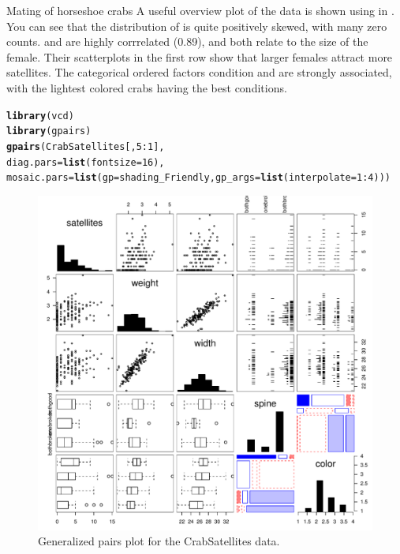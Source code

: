 \documentclass[11pt]{book}\usepackage[]{graphicx}\usepackage[]{color}
\makeatletter
\newcommand{\hlnum}[1]{\textcolor[rgb]{0.686,0.059,0.569}{#1}}%
\newcommand{\hlopt}[1]{\textcolor[rgb]{0,0,0}{#1}}%
\newcommand{\hlstd}[1]{\textcolor[rgb]{0.345,0.345,0.345}{#1}}%
\newcommand{\hlkwc}[1]{\textcolor[rgb]{0.333,0.667,0.333}{#1}}%
\newcommand{\hlkwd}[1]{\textcolor[rgb]{0.737,0.353,0.396}{\textbf{#1}}}%
\newenvironment{kframe}{%
 \def\at@end@of@kframe{}%
 \ifinner\ifhmode%
  \def\at@end@of@kframe{\end{minipage}}%
  \begin{minipage}{\columnwidth}%
 \fi\fi%
 \def\FrameCommand##1{\hskip\@totalleftmargin \hskip-\fboxsep
 \colorbox{shadecolor}{##1}\hskip-\fboxsep
     \hskip-\linewidth \hskip-\@totalleftmargin \hskip\columnwidth}%
 \MakeFramed {\advance\hsize-\width
   \@totalleftmargin\z@ \linewidth\hsize
   \@setminipage}}%
 {\par\unskip\endMakeFramed%
 \at@end@of@kframe}
\newenvironment{knitrout}{}{} %
\renewenvironment{knitrout}{\small\renewcommand{\baselinestretch}{.85}}{} %
\makeatother
\begin{document}
\begin{Example}[crabs1]{Mating of horseshoe crabs}
A useful overview plot of the data is shown using  in .
You can see that the distribution of  is quite positively skewed,
with many zero counts.   and  are highly corrrelated (0.89),
and both relate to the size of the female.
Their scatterplots in the first row show that larger females attract more satellites.
The categorical ordered factors  condition and  are strongly
associated, with the lightest colored crabs having the best conditions.
\begin{knitrout}
\color{fgcolor}\begin{kframe}
\begin{alltt}
\hlkwd{library}\hlstd{(vcd)}
\hlkwd{library}\hlstd{(gpairs)}
\hlkwd{gpairs}\hlstd{(CrabSatellites[,}\hlnum{5}\hlopt{:}\hlnum{1}\hlstd{],}
       \hlkwc{diag.pars} \hlstd{=} \hlkwd{list}\hlstd{(}\hlkwc{fontsize}\hlstd{=}\hlnum{16}\hlstd{),}
       \hlkwc{mosaic.pars} \hlstd{=} \hlkwd{list}\hlstd{(}\hlkwc{gp}\hlstd{=shading_Friendly,} \hlkwc{gp_args}\hlstd{=}\hlkwd{list}\hlstd{(}\hlkwc{interpolate}\hlstd{=}\hlnum{1}\hlopt{:}\hlnum{4}\hlstd{)))}
\end{alltt}
\end{kframe}\begin{figure}[!htbp]


\centerline{\includegraphics[width=.8\textwidth]{ch09/fig/crabs1-gpairs} }

\caption[Generalized pairs plot for the CrabSatellites data]{Generalized pairs plot for the CrabSatellites data.\label{fig:crabs1-gpairs}}
\end{figure}



\end{knitrout}
\end{Example}
\end{document}
